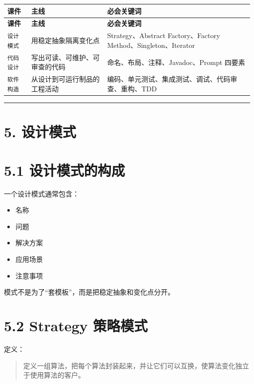 \documentclass[UTF8,zihao=-4]{ctexart}
\begin{document}
{
\footnotesize
\begin{longtable}{|>{\raggedright\arraybackslash}p{}|>{\raggedright\arraybackslash}p{}|>{\raggedright\arraybackslash}p{}|}
\hline
\textbf{课件} & \textbf{主线} & \textbf{必会关键词} \\
\hline
\endfirsthead
\hline
\textbf{课件} & \textbf{主线} & \textbf{必会关键词} \\
\hline
\endhead
\texttt{设计模式} & 用稳定抽象隔离变化点 & Strategy、Abstract Factory、Factory Method、Singleton、Iterator \\
\hline
\texttt{代码设计} & 写出可读、可维护、可审查的代码 & 命名、布局、注释、Javadoc、Prompt 四要素 \\
\hline
\texttt{软件构造} & 从设计到可运行制品的工程活动 & 编码、单元测试、集成测试、调试、代码审查、重构、TDD \\
\hline
\end{longtable}
}


\bigskip\hrule\bigskip

\section{5. 设计模式}

\section{5.1 设计模式的构成}

一个设计模式通常包含：

\begin{itemize}
\item 名称
\item 问题
\item 解决方案
\item 应用场景
\item 注意事项
\end{itemize}

模式不是为了“套模板”，而是把稳定抽象和变化点分开。

\section{5.2 Strategy 策略模式}

定义：

\begin{quote}
定义一组算法，把每个算法封装起来，并让它们可以互换，使算法变化独立于使用算法的客户。
\end{quote}
\end{document}
